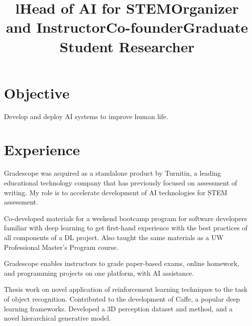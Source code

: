 \documentclass[line, margin]{res}
\title{l}\\
\begin{document}
\newsectionwidth{1in}

\address{\small{\textcolor{MidnightBlue}{https://sergeykarayev.com} $\cdot$ \textcolor{MidnightBlue}{sergeykarayev@gmail.com} $\cdot$ Updated 2020 June 17}}

\begin{resume}
\section{\sc Objective}
Develop and deploy AI systems to improve human life.

\section{\sc Experience}

\title{\bf Head of AI for STEM}
\begin{position}
Gradescope was acquired as a standalone product by Turnitin, a leading educational technology company that has previously focused on assessment of writing.
My role is to accelerate development of AI technologies for STEM assessment.
\end{position}

\title{\bf Organizer and Instructor}
\begin{position}
Co-developed materials for a weekend bootcamp program for software developers familiar with deep learning to get first-hand experience with the best practices of all components of a DL project. Also taught the same materials as a UW Professional Master's Program course.
\end{position}

\title{\bf Co-founder}
\begin{position}
Gradescope enables instructors to grade paper-based exams, online homework, and programming projects on one platform, with AI assistance.
\end{position}

\title{\bf Graduate Student Researcher}
\begin{position}
Thesis work on novel application of reinforcement learning techniques to the task of object recognition.
Contributed to the development of Caffe, a popular deep learning frameworks.
Developed a 3D perception dataset and method, and a novel hierarchical generative model.
\end{position}


\end{resume}
\end{document}
